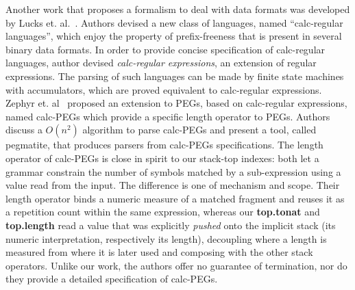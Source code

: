 \documentclass[preprint,12pt]{elsarticle}
\theoremstyle{definition}
\begin{document}
Another work that proposes a formalism to deal with data formats was developed by Lucks
et. al.~\cite{Lucks17}. Authors devised a new class of languages, named
``calc-regular languages'', which enjoy the property of prefix-freeness that is
present in several binary data formats. In order to provide concise specification
of calc-regular languages, author devised \emph{calc-regular expressions}, an
extension of regular expressions. The parsing of such languages can be made by
finite state machines with accumulators, which are proved equivalent to calc-regular
expressions. Zephyr et. al~\cite{Zephyr21} proposed an extension to PEGs, based on
calc-regular expressions, named calc-PEGs which provide a specific length
operator to PEGs. Authors discuss a $O(n^2)$ algorithm to parse calc-PEGs and
present a tool, called pegmatite, that produces parsers from calc-PEGs specifications.
The length operator of calc-PEGs is close in spirit to our stack-top indexes: both
let a grammar constrain the number of symbols matched by a sub-expression using a
value read from the input. The difference is one of mechanism and scope. Their
length operator binds a numeric measure of a matched fragment and reuses it as a
repetition count within the same expression, whereas our \textbf{top.tonat} and
\textbf{top.length} read a value that was explicitly \emph{pushed} onto the
implicit stack (its numeric interpretation, respectively its length), decoupling
where a length is measured from where it is later used and composing with the
other stack operators. Unlike our work, the authors offer no guarantee of
termination, nor do they provide a detailed specification of calc-PEGs.
\end{document}
